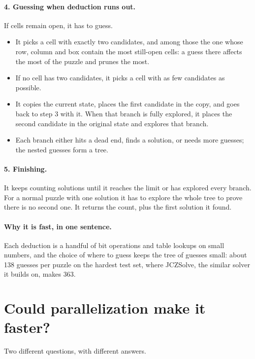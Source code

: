 \documentclass[11pt]{article}
\begin{document}
\paragraph{4. Guessing when deduction runs out.} If cells remain open, it has to guess.
\begin{itemize}
\item It picks a cell with exactly two candidates, and among those the one whose row, column and box contain the most
  still-open cells: a guess there affects the most of the puzzle and prunes the most.
\item If no cell has two candidates, it picks a cell with as few candidates as possible.
\item It copies the current state, places the first candidate in the copy, and goes back to step 3 with it. When that
  branch is fully explored, it places the second candidate in the original state and explores that branch.
\item Each branch either hits a dead end, finds a solution, or needs more guesses; the nested guesses form a tree.
\end{itemize}

\paragraph{5. Finishing.} It keeps counting solutions until it reaches the limit or has explored every branch. For a
normal puzzle with one solution it has to explore the whole tree to prove there is no second one. It returns the
count, plus the first solution it found.

\paragraph{Why it is fast, in one sentence.} Each deduction is a handful of bit operations and table lookups on small
numbers, and the choice of where to guess keeps the tree of guesses small: about 138 guesses per puzzle on the hardest
test set, where JCZSolve, the similar solver it builds on, makes 363.


\section*{Could parallelization make it faster?}

Two different questions, with different answers.
\end{document}
